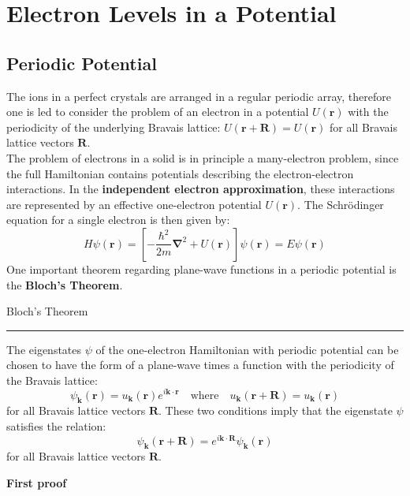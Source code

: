 \documentclass[10.75pt,a4paper,openright,bottom=2cm]{article}
\renewcommand{\Vec}[1]{\boldsymbol{#1}}
\begin{document}
\section{Electron Levels in a Potential}
\subsection{Periodic Potential}
The ions in a perfect crystals are arranged in a regular periodic array, therefore one is led to consider the problem of an electron in a potential $U(\Vec{r})$ with the periodicity of the underlying Bravais lattice: $U(\Vec{r}+\Vec{R})=U(\Vec{r})$ for all Bravais lattice vectors $\Vec{R}$.\\
The problem of electrons in a solid is in principle a many-electron problem, since the full Hamiltonian contains potentials describing the electron-electron interactions. In the \textbf{independent electron approximation}, these interactions are represented by an effective one-electron potential $U(\Vec{r})$. The Schr\"odinger equation for a single electron is then given by:
\[
H\psi(\Vec{r})=\left[-\frac{\hbar^2}{2m}\Vec{\nabla}^2+U(\Vec{r})\right]\psi(\Vec{r})=E\psi(\Vec{r})
\]
One important theorem regarding plane-wave functions in a periodic potential is the \textbf{Bloch's Theorem}.
\begin{mybox}
Bloch's Theorem{\color{blue!30}{g}}
\hrule
\vspace{0.25cm}
The eigenstates $\psi$ of the one-electron Hamiltonian with periodic potential can be chosen to have the form of a plane-wave times a function with the periodicity of the Bravais lattice:
\[
\psi_{\Vec{k}}(\Vec{r})=u_{\Vec{k}}(\Vec{r})e^{i\Vec{k}\cdot\Vec{r}} \quad \text{where} \quad u_{\Vec{k}}(\Vec{r}+\Vec{R})=u_{\Vec{k}}(\Vec{r})
\]
for all Bravais lattice vectors $\Vec{R}$. These two conditions imply that the eigenstate $\psi$ satisfies the relation:
\[
\psi_{\Vec{k}}(\Vec{r}+\Vec{R})=e^{i\Vec{k}\cdot\Vec{R}}\psi_{\Vec{k}}(\Vec{r})
\]
for all Bravais lattice vectors $\Vec{R}$.
\end{mybox}
\noindent
\textbf{First proof}
\end{document}

